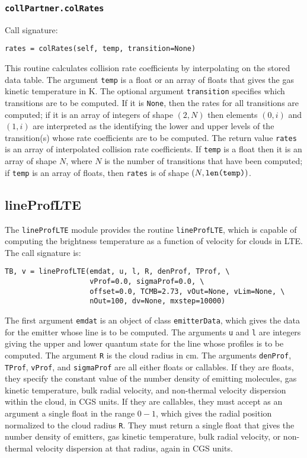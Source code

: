 \documentclass[12pt]{article}
\begin{document}
\subsubsection{\texttt{collPartner.colRates}}
\label{sec:colrates}

Call signature:

\begin{verbatim}
rates = colRates(self, temp, transition=None)
\end{verbatim}

This routine calculates collision rate coefficients by interpolating on the stored data table. The argument \verb=temp= is a float or an array of floats that gives the gas kinetic temperature in K. The optional argument \verb=transition= specifies which transitions are to be computed. If it is \verb=None=, then the rates for all transitions are computed; if it is an array of integers of shape $(2,N)$ then elements $(0,i)$ and $(1,i)$ are interpreted as the identifying the lower and upper levels of the transition(s) whose rate coefficients are to be computed. The return value \verb=rates= is an array of interpolated collision rate coefficients. If \verb=temp= is a float then it is an array of shape $N$, where $N$ is the number of transitions that have been computed; if \verb=temp= is an array of floats, then \verb=rates= is of shape $(N, \verb=len(temp)=)$.

\clearpage

\subsection{lineProfLTE}
\label{sec:lineproflte}

The \verb=lineProfLTE= module provides the routine \verb=lineProfLTE=, which is capable of computing the brightness temperature as a function of velocity for clouds in LTE. The call signature is:

\begin{verbatim}
TB, v = lineProfLTE(emdat, u, l, R, denProf, TProf, \
                    vProf=0.0, sigmaProf=0.0, \
                    offset=0.0, TCMB=2.73, vOut=None, vLim=None, \
                    nOut=100, dv=None, mxstep=10000)
\end{verbatim}

The first argument \verb=emdat= is an object of class \verb=emitterData=, which gives the data for the emitter whose line is to be computed. The arguments \verb=u= and \verb=l= are integers giving the upper and lower quantum state for the line whose profiles is to be computed. The argument \verb=R= is the cloud radius in cm. The arguments \verb=denProf=, \verb=TProf=, \verb=vProf=, and \verb=sigmaProf= are all either floats or callables. If they are floats, they specify the constant value of the number density of emitting molecules, gas kinetic temperature, bulk radial velocity, and non-thermal velocity dispersion within the cloud, in CGS units. If they are callables, they must accept as an argument a single float in the range $0-1$, which gives the radial position normalized to the cloud radius \verb=R=. They must return a single float that gives the number density of emitters, gas kinetic temperature, bulk radial velocity, or non-thermal velocity dispersion at that radius, again in CGS units.
\end{document}
